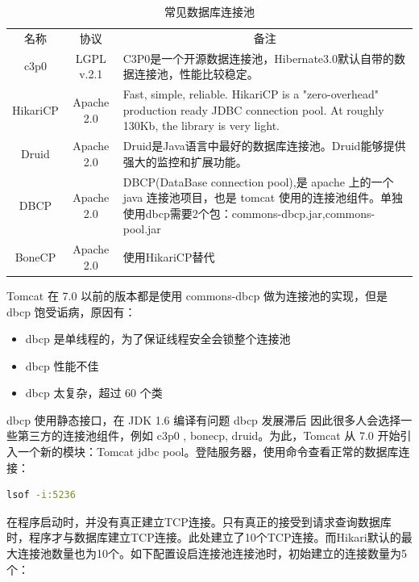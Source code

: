 \documentclass[12pt]{book}
\numberwithin{dummy}{section}
\theoremstyle{ocrenumbox}
\theoremstyle{blacknumex}
\theoremstyle{blacknumbox}
\theoremstyle{ocrenum}
\begin{document}
\begin{table}
	\caption{常见数据库连接池}
	\label{table:databaseconnectionpool}
	\begin{center}
	\begin{tabular}{|c|c|p{7cm}|}
		\hline
		\multirow{1}{*}{名称}
		& \multicolumn{1}{c|}{协议} 
		& \multicolumn{1}{c|}{备注}\\			
		\cline{1-3}
		c3p0 &  LGPL v.2.1  & C3P0是一个开源数据连接池，Hibernate3.0默认自带的数据连接池，性能比较稳定。\\
		\hline
		HikariCP & Apache 2.0 & Fast, simple, reliable. HikariCP is a "zero-overhead" production ready JDBC connection pool. At roughly 130Kb, the library is very light. \\
		\hline
		Druid & Apache 2.0 & Druid是Java语言中最好的数据库连接池。Druid能够提供强大的监控和扩展功能。 \\
		\hline
		DBCP & Apache 2.0 & DBCP(DataBase connection pool),是 apache 上的一个 java 连接池项目，也是 tomcat 使用的连接池组件。单独使用dbcp需要2个包：commons-dbcp.jar,commons-pool.jar \\
		\hline
		BoneCP & Apache 2.0 & 使用HikariCP替代\\
		\hline
	\end{tabular}	
	\end{center}
\end{table}


Tomcat 在 7.0 以前的版本都是使用 commons-dbcp 做为连接池的实现，但是 dbcp 饱受诟病，原因有：

\begin{itemize}
	\item{dbcp 是单线程的，为了保证线程安全会锁整个连接池}
	\item{dbcp 性能不佳}
	\item{dbcp 太复杂，超过 60 个类}
\end{itemize}

dbcp 使用静态接口，在 JDK 1.6 编译有问题
dbcp 发展滞后
因此很多人会选择一些第三方的连接池组件，例如 c3p0 , bonecp, druid。为此，Tomcat 从 7.0 开始引入一个新的模块：Tomcat jdbc pool。登陆服务器，使用命令查看正常的数据库连接：

\begin{lstlisting}[language=Bash]
lsof -i:5236
\end{lstlisting}

在程序启动时，并没有真正建立TCP连接。只有真正的接受到请求查询数据库时，程序才与数据库建立TCP连接。此处建立了10个TCP连接。而Hikari默认的最大连接池数量也为10个。如下配置设启连接池连接池时，初始建立的连接数量为5个：
\end{document}
